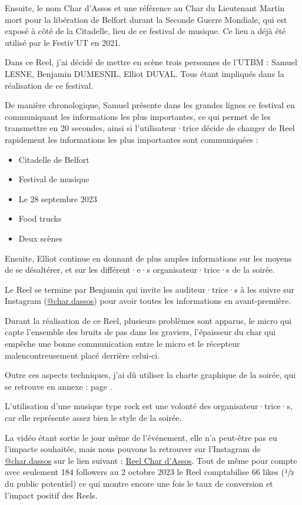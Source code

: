 Ensuite, le nom Char d'Assos et une référence au Char du Lieutenant Martin mort pour la libération de Belfort durant la Seconde Guerre Mondiale, qui est exposé à côté de la Citadelle, lieu de ce festival de musique.
Ce lieu a déjà été utilisé par le Festiv'UT en 2021.

Dans ce Reel, j'ai décidé de mettre en scène trois personnes de l'\gls{UTBM} : Samuel LESNE, Benjamin DUMESNIL, Elliot DUVAL.
Tous étant impliqués dans la réalisation de ce festival.

De manière chronologique, Samuel présente dans les grandes lignes ce festival en communiquant les informations les plus importantes, ce qui permet de les transmettre en 20 secondes, ainsi si l'utilisateur·trice décide de changer de Reel rapidement les informations les plus importantes sont communiquées :
\begin{itemize}
    \item Citadelle de Belfort
    \item Festival de musique
    \item Le 28 septembre 2023
    \item Food trucks
    \item Deux scènes
\end{itemize}

Ensuite, Elliot continue en donnant de plus amples informations sur les moyens de se désaltérer, et sur les différent·e·s organisateur·trice·s de la soirée.

Le Reel se termine par Benjamin qui invite les auditeur·trice·s à les suivre sur Instagram (\href{https://www.instagram.com/char.dassos/}{@char.dassos}) pour avoir toutes les informations en avant-première.

Durant la réalisation de ce Reel, plusieurs problèmes sont apparus, le micro qui capte l'ensemble des bruits de pas dans les graviers, l'épaisseur du char qui empêche une bonne communication entre le micro et le récepteur malencontreusement placé derrière celui-ci.

Outre ces aspects techniques, j'ai dû utiliser la charte graphique de la soirée, qui se retrouve en annexe : page \pageref{subsec:charte-char-dassos}.

L'utilisation d'une musique type rock est une volonté des organisateur·trice·s, car elle représente assez bien le style de la soirée.

La vidéo étant sortie le jour même de l'événement, elle n'a peut-être pas eu l'impacte souhaitée, mais nous pouvons la retrouver sur l'Instagram de \href{https://www.instagram.com/char.dassos/}{@char.dassos} sur le lien suivant : \href{https://www.instagram.com/reel/Cxuj5g2MKov/?utm_source=ig_web_button_share_sheet&igshid=MzRlODBiNWFlZA==}{Reel Char d'Assos}.
Tout de même pour compte avec seulement 184 followers au 2 octobre 2023 le Reel comptabilise 66 likes ($\sfrac{1}{3}$ du public potentiel) ce qui montre encore une fois le taux de conversion et l'impact positif des Reels.


